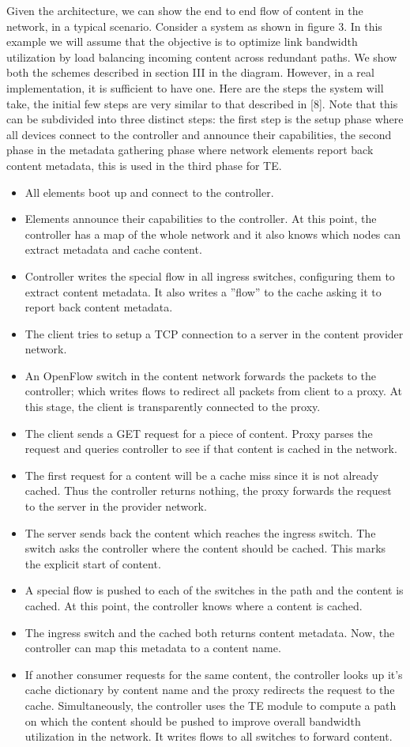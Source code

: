 \documentclass[conference]{IEEEtran}
\begin{document}
Given the architecture, we can show the end to end flow
of content in the network, in a typical scenario. Consider a
system as shown in figure 3. In this example we will assume
that the objective is to optimize link bandwidth utilization by
load balancing incoming content across redundant paths. We
show both the schemes described in section III in the diagram.
However, in a real implementation, it is sufficient to have one.
Here are the steps the system will take, the initial few steps
are very similar to that described in [8]. Note that this can
be subdivided into three distinct steps: the first step is the
setup phase where all devices connect to the controller and
announce their capabilities, the second phase in the metadata
gathering phase where network elements report back content
metadata, this is used in the third phase for TE.
\begin{itemize}
\item All elements boot up and connect to the controller.
\item Elements announce their capabilities to the controller. At
this point, the controller has a map of the whole network
and it also knows which nodes can extract metadata and
cache content.
\item Controller writes the special flow in all ingress switches,
configuring them to extract content metadata. It also
writes a ”flow” to the cache asking it to report back
content metadata.
\item The client tries to setup a TCP connection to a server in
the content provider network.
\item An OpenFlow switch in the content network forwards the
packets to the controller; which writes flows to redirect
all packets from client to a proxy. At this stage, the client
is transparently connected to the proxy.
\item The client sends a GET request for a piece of content.
Proxy parses the request and queries controller to see if
that content is cached in the network.
\item The first request for a content will be a cache miss
since it is not already cached. Thus the controller returns
nothing, the proxy forwards the request to the server in
the provider network.
\item The server sends back the content which reaches the
ingress switch. The switch asks the controller where the
content should be cached. This marks the explicit start of
content.
\item A special flow is pushed to each of the switches in the
path and the content is cached. At this point, the controller
knows where a content is cached.
\item The ingress switch and the cached both returns content
metadata. Now, the controller can map this metadata to a content name.
\item If another consumer requests for the same content, the
controller looks up it’s cache dictionary by content name
and the proxy redirects the request to the cache. Simultaneously,
the controller uses the TE module to compute a
path on which the content should be pushed to improve
overall bandwidth utilization in the network. It writes
flows to all switches to forward content.
\end{itemize}
\end{document}
